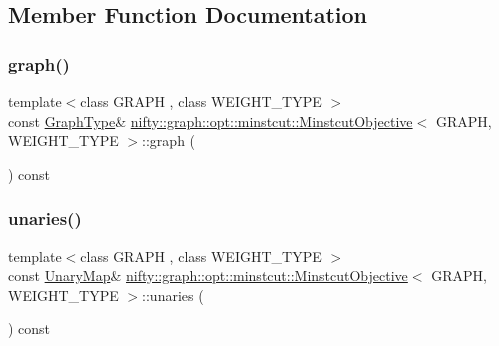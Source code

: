 \subsection{Member Function Documentation}
\mbox{\label{classnifty_1_1graph_1_1opt_1_1minstcut_1_1MinstcutObjective_af0dc330909000b8840eb93d8f33efb18}} 
\subsubsection{\texorpdfstring{graph()}{graph()}}
{\footnotesize\ttfamily template$<$class G\+R\+A\+PH , class W\+E\+I\+G\+H\+T\+\_\+\+T\+Y\+PE $>$ \\
const \hyperlink{classnifty_1_1graph_1_1opt_1_1minstcut_1_1MinstcutObjective_a8d416ff18d747ac8ac242dde0e1406c0}{Graph\+Type}\& \hyperlink{classnifty_1_1graph_1_1opt_1_1minstcut_1_1MinstcutObjective}{nifty\+::graph\+::opt\+::minstcut\+::\+Minstcut\+Objective}$<$ G\+R\+A\+PH, W\+E\+I\+G\+H\+T\+\_\+\+T\+Y\+PE $>$\+::graph (\begin{DoxyParamCaption}{ }\end{DoxyParamCaption}) const\hspace{0.3cm}{\ttfamily [inline]}}

\mbox{\label{classnifty_1_1graph_1_1opt_1_1minstcut_1_1MinstcutObjective_af16923a509758da3fe2093404a5c3bdf}} 
\subsubsection{\texorpdfstring{unaries()}{unaries()}\hspace{0.1cm}{\footnotesize\ttfamily [1/2]}}
{\footnotesize\ttfamily template$<$class G\+R\+A\+PH , class W\+E\+I\+G\+H\+T\+\_\+\+T\+Y\+PE $>$ \\
const \hyperlink{classnifty_1_1graph_1_1opt_1_1minstcut_1_1MinstcutObjective_a1662c8902f85cd5d0aa046c5657ee0f2}{Unary\+Map}\& \hyperlink{classnifty_1_1graph_1_1opt_1_1minstcut_1_1MinstcutObjective}{nifty\+::graph\+::opt\+::minstcut\+::\+Minstcut\+Objective}$<$ G\+R\+A\+PH, W\+E\+I\+G\+H\+T\+\_\+\+T\+Y\+PE $>$\+::unaries (\begin{DoxyParamCaption}{ }\end{DoxyParamCaption}) const\hspace{0.3cm}{\ttfamily [inline]}}

